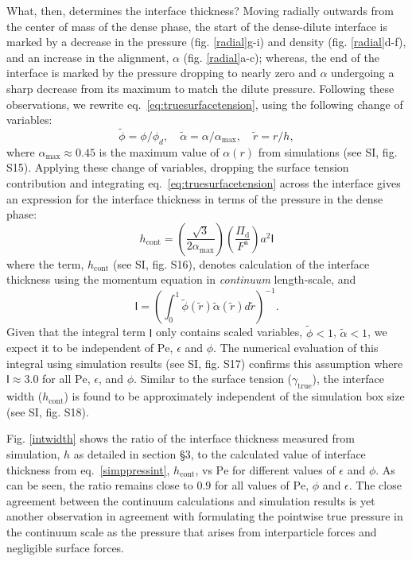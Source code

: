 \documentclass[twoside,twocolumn,9pt]{article}
\begin{document}
What, then, determines the interface thickness? Moving radially outwards from the center of mass of the dense phase, the start of the dense-dilute interface is marked by a decrease in the pressure (fig. \ref{radial}g-i) and density (fig. \ref{radial}d-f), and an increase in the alignment, $\alpha$ (fig. \ref{radial}a-c); whereas, the end of the interface is marked by the pressure dropping to nearly zero and $\alpha$ undergoing a 
sharp decrease from its maximum to match the dilute pressure. Following these observations, we rewrite eq.~\ref{eq:truesurfacetension},
using the following change of variables: $$\tilde{\phi}=\phi/\phi_{d},\quad \tilde{\alpha}=\alpha/\alpha_\text{max},\quad \tilde{r}=r/h,$$ 
where $\alpha_\text{max} \approx 0.45$ is the maximum value of $\alpha(r)$  from simulations (see SI, fig. S15). Applying these change of variables, dropping the surface tension contribution and integrating eq.~\ref{eq:truesurfacetension} across the interface gives an expression for the interface thickness in terms of the pressure in the dense phase:  
\begin{equation}\label{simppressint}
h_\text{cont}=\left(\frac{\sqrt{3}}{2\alpha_\text{max}}\right)\left(\frac{\Pi_\text{d}}{F^\text{a}}\right) a^2 \mathsf{I}
\end{equation}
where the term, $h_\mathrm{cont}$ (see SI, fig. S16), denotes 
calculation of the interface thickness using the momentum equation in \emph{continuum} length-scale, and 
$$\mathsf{I}=\left(\int_0^1 \tilde{\phi}(\tilde{r})\tilde{\alpha}(\tilde{r})d\tilde{r} \right)^{-1}.$$ 
Given that the integral term $\mathsf{I}$ only contains scaled variables, $\tilde{\phi}<1$, $\tilde{\alpha}<1$, we expect it to be independent of $\mathrm{Pe}$, $\epsilon$ and $\phi$. The numerical evaluation of 
this integral using simulation results (see SI, fig. S17) confirms this assumption where $\mathsf{I}\approx3.0$ for all $\mathrm{Pe}$, $\epsilon$, and $\phi$. Similar to the surface tension ($\gamma_\mathrm{true}$), the interface width ($h_\mathrm{cont}$) is found to be approximately independent of the simulation box size (see SI, fig. S18). 

Fig. \ref{intwidth} shows the ratio of the interface thickness measured from simulation, $h$ as detailed in section \S3, to the calculated value of interface thickness from eq.~\ref{simppressint}, $h_\text{cont}$, vs $\mathrm{Pe}$ for different values of $\epsilon$ and $\phi$. As can be seen, the ratio remains close to $0.9$ for all values of $\mathrm{Pe}$, $\phi$ and $\epsilon$. The close agreement between the continuum calculations and simulation results is yet another observation in agreement with formulating the pointwise true pressure in the continuum scale as the pressure that arises from interparticle forces and negligible surface forces. 
\end{document}
